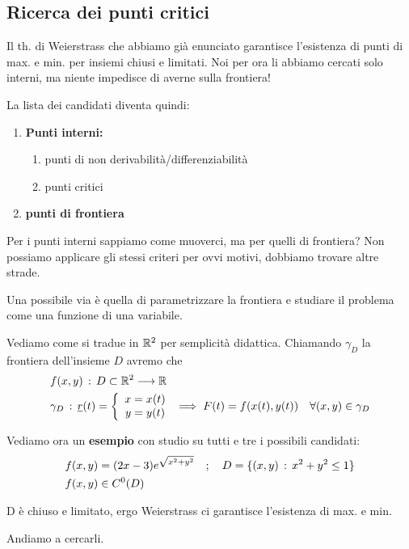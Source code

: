 \newpage 

\subsection{Ricerca dei punti critici}

Il th. di Weierstrass che abbiamo già enunciato garantisce l'esistenza di punti di max. e min. per insiemi chiusi e limitati. Noi per ora li abbiamo cercati solo interni, ma niente impedisce di averne sulla frontiera! 

La lista dei candidati diventa quindi:
\begin{enumerate}
	\item \textbf{Punti interni:}
	\begin{enumerate}
		\item punti di non derivabilità/differenziabilità
		\item punti critici
	\end{enumerate}
	\item \textbf{punti di frontiera}
\end{enumerate}

Per i punti interni sappiamo come muoverci, ma per quelli di frontiera?
Non possiamo applicare gli stessi criteri per ovvi motivi, dobbiamo trovare altre strade.

\bigskip

Una possibile via è quella di parametrizzare la frontiera e studiare il problema come una funzione di una variabile. 

Vediamo come si tradue in $\mathbb{R}^2$ per semplicità didattica. Chiamando $\gamma_D$ la frontiera dell'insieme $D$ avremo che
\begin{align}
	{}&f(x,y) \, : \, D \subset \mathbb{R}^2 \longrightarrow \mathbb{R}\\
	&\gamma_D \, : \, \underline{r}(t)=\left\{\begin{array}{cc} x= x(t) \\ y= y(t) \end{array}\right. \implies F(t)=f(x(t),y(t)) \quad \forall(x,y)\in \gamma_D
\end{align}

Vediamo ora un \textbf{esempio} con studio su tutti e tre i possibili candidati:
\begin{align}
	{}&f(x,y)=(2x-3)e^{\sqrt{x^2 + y^2}} \quad ; \quad D=\{ (x,y) \, : \, x^2 + y^2 \leq 1 \} \\
	&f(x,y)\in C^0(D)
\end{align}

D è chiuso e limitato, ergo Weierstrass ci garantisce l'esistenza di max. e min.

Andiamo a cercarli.

